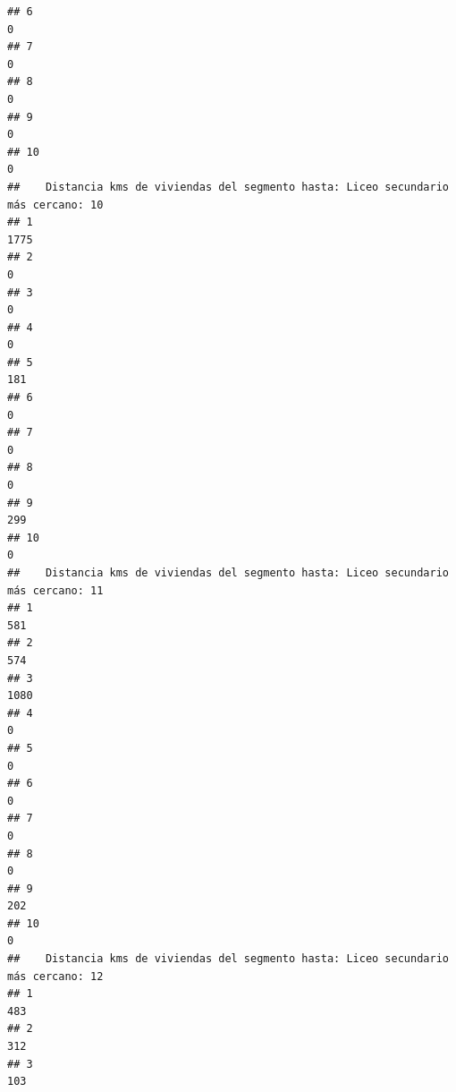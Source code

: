 \documentclass[11pt,]{article}
\begin{document}
\begin{verbatim}
## 6                                                                               0
## 7                                                                               0
## 8                                                                               0
## 9                                                                               0
## 10                                                                              0
##    Distancia kms de viviendas del segmento hasta: Liceo secundario más cercano: 10
## 1                                                                             1775
## 2                                                                                0
## 3                                                                                0
## 4                                                                                0
## 5                                                                              181
## 6                                                                                0
## 7                                                                                0
## 8                                                                                0
## 9                                                                              299
## 10                                                                               0
##    Distancia kms de viviendas del segmento hasta: Liceo secundario más cercano: 11
## 1                                                                              581
## 2                                                                              574
## 3                                                                             1080
## 4                                                                                0
## 5                                                                                0
## 6                                                                                0
## 7                                                                                0
## 8                                                                                0
## 9                                                                              202
## 10                                                                               0
##    Distancia kms de viviendas del segmento hasta: Liceo secundario más cercano: 12
## 1                                                                              483
## 2                                                                              312
## 3                                                                              103

\end{verbatim}
\end{document}
